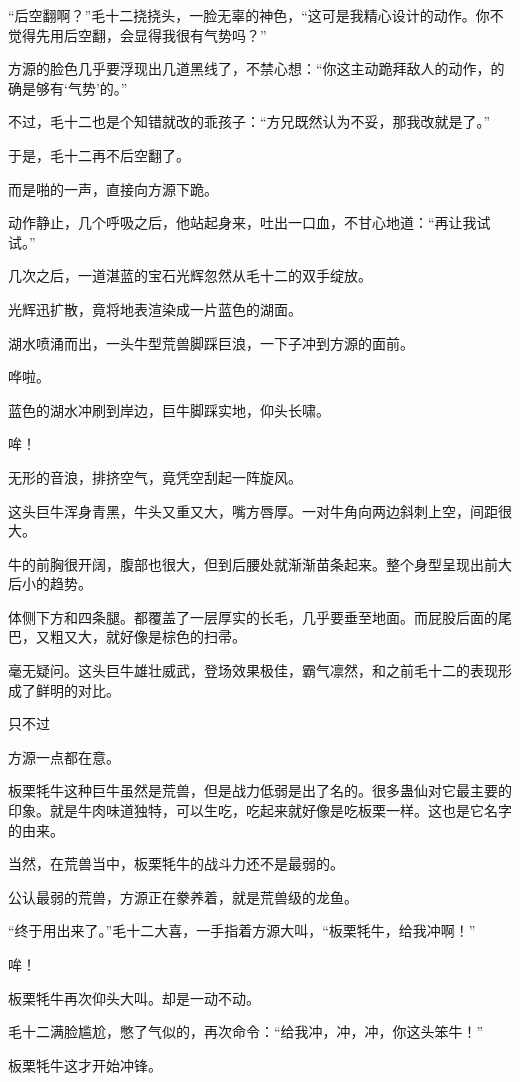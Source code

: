 \begin{this_body}
“后空翻啊？”毛十二挠挠头，一脸无辜的神色，“这可是我精心设计的动作。你不觉得先用后空翻，会显得我很有气势吗？”

方源的脸色几乎要浮现出几道黑线了，不禁心想：“你这主动跪拜敌人的动作，的确是够有‘气势’的。”

不过，毛十二也是个知错就改的乖孩子：“方兄既然认为不妥，那我改就是了。”

于是，毛十二再不后空翻了。

而是啪的一声，直接向方源下跪。

动作静止，几个呼吸之后，他站起身来，吐出一口血，不甘心地道：“再让我试试。”

几次之后，一道湛蓝的宝石光辉忽然从毛十二的双手绽放。

光辉迅扩散，竟将地表渲染成一片蓝色的湖面。

湖水喷涌而出，一头牛型荒兽脚踩巨浪，一下子冲到方源的面前。

哗啦。

蓝色的湖水冲刷到岸边，巨牛脚踩实地，仰头长啸。

哞！

无形的音浪，排挤空气，竟凭空刮起一阵旋风。

这头巨牛浑身青黑，牛头又重又大，嘴方唇厚。一对牛角向两边斜刺上空，间距很大。

牛的前胸很开阔，腹部也很大，但到后腰处就渐渐苗条起来。整个身型呈现出前大后小的趋势。

体侧下方和四条腿。都覆盖了一层厚实的长毛，几乎要垂至地面。而屁股后面的尾巴，又粗又大，就好像是棕色的扫帚。

毫无疑问。这头巨牛雄壮威武，登场效果极佳，霸气凛然，和之前毛十二的表现形成了鲜明的对比。

只不过

方源一点都在意。

板栗牦牛这种巨牛虽然是荒兽，但是战力低弱是出了名的。很多蛊仙对它最主要的印象。就是牛肉味道独特，可以生吃，吃起来就好像是吃板栗一样。这也是它名字的由来。

当然，在荒兽当中，板栗牦牛的战斗力还不是最弱的。

公认最弱的荒兽，方源正在豢养着，就是荒兽级的龙鱼。

“终于用出来了。”毛十二大喜，一手指着方源大叫，“板栗牦牛，给我冲啊！”

哞！

板栗牦牛再次仰头大叫。却是一动不动。

毛十二满脸尴尬，憋了气似的，再次命令：“给我冲，冲，冲，你这头笨牛！”

板栗牦牛这才开始冲锋。


\end{this_body}
